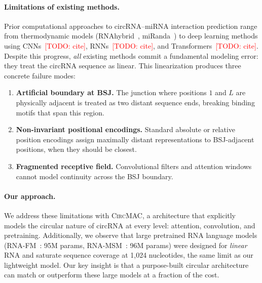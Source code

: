 \documentclass[10pt,twocolumn]{article}
\newcommand{\todo}[1]{\textcolor{red}{[TODO: #1]}}
\newcommand{\circmac}{\textsc{CircMAC}}
\begin{document}
\paragraph{Limitations of existing methods.}
Prior computational approaches to circRNA--miRNA interaction prediction
range from thermodynamic models (RNAhybrid~\cite{rehmsmeier2004fast},
miRanda~\cite{enright2003microrna}) to deep learning methods using
CNNs~\todo{cite}, RNNs~\todo{cite}, and Transformers~\todo{cite}.
Despite this progress, \emph{all} existing methods commit a fundamental
modeling error: they treat the circRNA sequence as linear.
This linearization produces three concrete failure modes:
%
\begin{enumerate}[leftmargin=*,itemsep=2pt]
  \item \textbf{Artificial boundary at BSJ.}
    The junction where positions $1$ and $L$ are physically adjacent is
    treated as two distant sequence ends, breaking binding motifs that
    span this region.
  \item \textbf{Non-invariant positional encodings.}
    Standard absolute or relative position encodings assign maximally
    distant representations to BSJ-adjacent positions, when they should
    be closest.
  \item \textbf{Fragmented receptive field.}
    Convolutional filters and attention windows cannot model continuity
    across the BSJ boundary.
\end{enumerate}

\paragraph{Our approach.}
We address these limitations with \circmac{}, a architecture that
explicitly models the circular nature of circRNA at every level:
attention, convolution, and pretraining.
Additionally, we observe that large pretrained RNA language models
(RNA-FM~\cite{chen2022interpretable}: 95M params, RNA-MSM~\cite{zhang2024multiple}: 96M params)
were designed for \emph{linear} RNA and saturate sequence coverage
at 1,024 nucleotides, the same limit as our lightweight model.
Our key insight is that a purpose-built circular architecture can
match or outperform these large models at a fraction of the cost.
\end{document}
